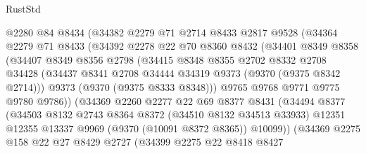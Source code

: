 \begin{lexlean}{RustStd}
\begin{coremodule}
                  @2280
                  @84
                  @8434
                  (@34382
                    @2279
                    @71
                    @2714
                    @8433
                    @2817
                    @9528
                    (@34364
                      @2279
                      @71
                      @8433
                      (@34392
                        @2278
                        @22
                        @70
                        @8360
                        @8432
                        (@34401
                          @8349
                          @8358
                          (@34407
                            @8349
                            @8356
                            @2798
                            (@34415
                              @8348
                              @8355
                              @2702
                              @8332
                              @2708
                              @34428
                              (@34437 @8341 @2708 @34444 @34319 @9373 (@9370 (@9375 @8342 @2714)))
                              @9373
                              (@9370 (@9375 @8333 @8348)))
                            @9765
                            @9768
                            @9771
                            @9775
                            @9780
                            @9786))
                        (@34369
                          @2260
                          @2277
                          @22
                          @69
                          @8377
                          @8431
                          (@34494
                            @8377
                            (@34503
                              @8132
                              @2743
                              @8364
                              @8372
                              (@34510 @8132 @34513 @33933)
                              @12351
                              @12355
                              @13337
                              @9969
                              (@9370 (@10091 @8372 @8365))
                              @10099))
                          (@34369
                            @2275
                            @158
                            @22
                            @27
                            @8429
                            @2727
                            (@34399
                              @2275
                              @22
                              @8418
                              @8427

\end{coremodule}
\end{lexlean}
